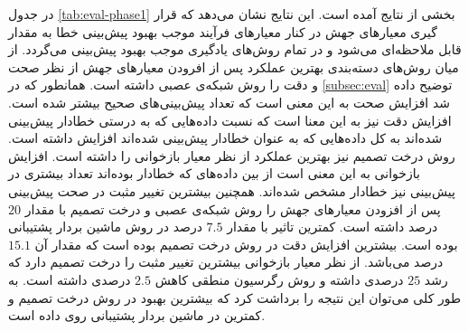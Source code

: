 در جدول \ref{tab:eval-phase1} بخشی از نتایج آمده است. این نتایج نشان می‌دهد که قرار گیری معیارهای جهش در کنار معیارهای فرآیند موجب بهبود پیش‌بینی خطا به مقدار قابل ملاحظه‌ای می‌شود و در تمام  روش‌های  یادگیری موجب بهبود  پیش‌بینی می‌گردد. از میان روش‌های دسته‌بندی بهترین عملکرد   پس از افرودن معیارهای جهش  از نظر صحت و دقت را روش شبکه‌ی عصبی داشته است. همانطور  که در \ref{subsec:eval} توضیح داده شد  افزایش صحت به این معنی است که تعداد پیش‌بینی‌های صحیح بیشتر شده است. افزایش دقت نیز به این معنا است که نسبت داده‌هایی که به درستی خطادار پیش‌بینی شده‌اند  به کل داده‌هایی که به عنوان خطادار پیش‌بینی شده‌اند افزایش داشته است. روش   درخت تصمیم نیز بهترین عملکرد از نظر  معیار بازخوانی را  داشته است.  افزایش بازخوانی به این معنی است از بین داده‌های که خطادار بوده‌اند تعداد بیشتری در پیش‌بینی نیز خطادار مشخص شده‌اند. همچنین بیشترین تغییر مثبت در صحت پیش‌بینی پس از افزودن معیارهای جهش را روش شبکه‌ی عصبی   و  درخت تصمیم با مقدار $20$ درصد داشته است.  کمترین تاثیر با مقدار $7.5$ درصد در روش ماشین بردار پشتیبانی بوده است. بیشترین افزایش دقت در روش درخت تصمیم بوده است که مقدار آن $15.1$ درصد می‌باشد. از نظر معیار بازخوانی بیشترین تغییر مثبت را درخت تصمیم دارد که رشد $25$ درصدی داشته و روش رگرسیون منطقی کاهش $2.5$ درصدی داشته است. به طور کلی می‌توان این نتیجه را برداشت کرد که بیشترین بهبود در روش درخت تصمیم و کمترین در ماشین بردار پشتیبانی روی داده است.

